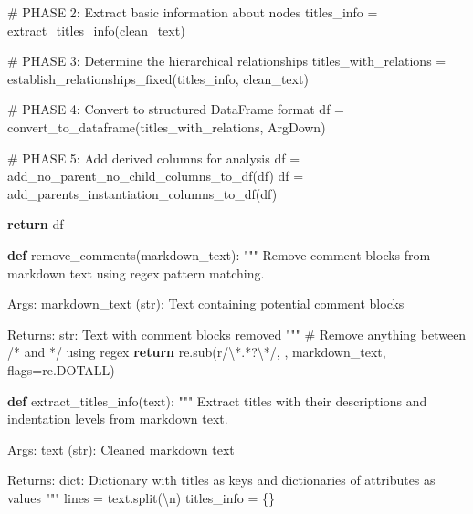 \documentclass[
  11pt,
  letterpaper,
]{book}
\newenvironment{Shaded}{\begin{snugshade}}{\end{snugshade}}
\newcommand{\CharTok}[1]{\textcolor[rgb]{0.13,0.47,0.30}{#1}}
\newcommand{\CommentTok}[1]{\textcolor[rgb]{0.37,0.37,0.37}{#1}}
\newcommand{\ControlFlowTok}[1]{\textcolor[rgb]{0.00,0.23,0.31}{\textbf{#1}}}
\newcommand{\DecValTok}[1]{\textcolor[rgb]{0.68,0.00,0.00}{#1}}
\newcommand{\KeywordTok}[1]{\textcolor[rgb]{0.00,0.23,0.31}{\textbf{#1}}}
\newcommand{\NormalTok}[1]{\textcolor[rgb]{0.00,0.23,0.31}{#1}}
\newcommand{\OperatorTok}[1]{\textcolor[rgb]{0.37,0.37,0.37}{#1}}
\newcommand{\StringTok}[1]{\textcolor[rgb]{0.13,0.47,0.30}{#1}}
\newcommand{\VerbatimStringTok}[1]{\textcolor[rgb]{0.13,0.47,0.30}{#1}}
\begin{document}
\begin{Shaded}
\begin{Highlighting}[]
    \CommentTok{\# PHASE 2: Extract basic information about nodes}
\NormalTok{    titles\_info }\OperatorTok{=}\NormalTok{ extract\_titles\_info(clean\_text)}

    \CommentTok{\# PHASE 3: Determine the hierarchical relationships}
\NormalTok{    titles\_with\_relations }\OperatorTok{=}\NormalTok{ establish\_relationships\_fixed(titles\_info, clean\_text)}

    \CommentTok{\# PHASE 4: Convert to structured DataFrame format}
\NormalTok{    df }\OperatorTok{=}\NormalTok{ convert\_to\_dataframe(titles\_with\_relations, ArgDown)}

    \CommentTok{\# PHASE 5: Add derived columns for analysis}
\NormalTok{    df }\OperatorTok{=}\NormalTok{ add\_no\_parent\_no\_child\_columns\_to\_df(df)}
\NormalTok{    df }\OperatorTok{=}\NormalTok{ add\_parents\_instantiation\_columns\_to\_df(df)}

    \ControlFlowTok{return}\NormalTok{ df}

\KeywordTok{def}\NormalTok{ remove\_comments(markdown\_text):}
    \CommentTok{"""}
\CommentTok{    Remove comment blocks from markdown text using regex pattern matching.}

\CommentTok{    Args:}
\CommentTok{        markdown\_text (str): Text containing potential comment blocks}

\CommentTok{    Returns:}
\CommentTok{        str: Text with comment blocks removed}
\CommentTok{    """}
    \CommentTok{\# Remove anything between /* and */ using regex}
    \ControlFlowTok{return}\NormalTok{ re.sub(}\VerbatimStringTok{r\textquotesingle{}/}\CharTok{\textbackslash{}*}\DecValTok{.}\OperatorTok{*?}\CharTok{\textbackslash{}*}\VerbatimStringTok{/\textquotesingle{}}\NormalTok{, }\StringTok{\textquotesingle{}\textquotesingle{}}\NormalTok{, markdown\_text, flags}\OperatorTok{=}\NormalTok{re.DOTALL)}

\KeywordTok{def}\NormalTok{ extract\_titles\_info(text):}
    \CommentTok{"""}
\CommentTok{    Extract titles with their descriptions and indentation levels from markdown text.}

\CommentTok{    Args:}
\CommentTok{        text (str): Cleaned markdown text}

\CommentTok{    Returns:}
\CommentTok{        dict: Dictionary with titles as keys and dictionaries of attributes as values}
\CommentTok{    """}
\NormalTok{    lines }\OperatorTok{=}\NormalTok{ text.split(}\StringTok{\textquotesingle{}}\CharTok{\textbackslash{}n}\StringTok{\textquotesingle{}}\NormalTok{)}
\NormalTok{    titles\_info }\OperatorTok{=}\NormalTok{ \{\}}


\end{Highlighting}
\end{Shaded}
\end{document}
